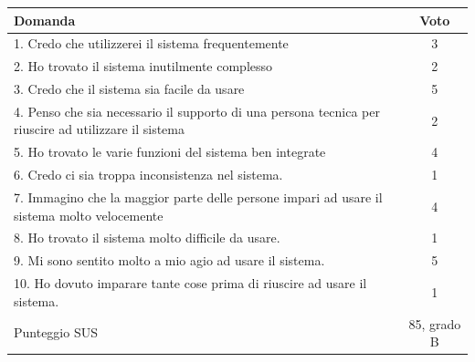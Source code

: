 \documentclass[../Report.tex]{subfiles}
\begin{document}
    \begin{table}[H]
        \begin{tabular}{|p{10cm}|c|}
            \hline
            \textbf{Domanda} & \textbf{Voto}\\
            \hline
            1. \cellcolor{green} Credo che utilizzerei il sistema frequentemente & 3\\
            \hline
            2. \cellcolor{red} Ho trovato il sistema inutilmente complesso & 2 \\
            \hline
            3. \cellcolor{green} Credo che il sistema sia facile da usare & 5 \\
            \hline
            4. \cellcolor{red} Penso che sia necessario il supporto di una persona tecnica per riuscire ad utilizzare il sistema & 2 \\
            \hline
            5. \cellcolor{green} Ho trovato le varie funzioni del sistema ben integrate & 4 \\
            \hline
            6. \cellcolor{red} Credo ci sia troppa inconsistenza nel sistema. & 1\\
            \hline
            7. \cellcolor{green} Immagino che la maggior parte delle persone impari ad usare il sistema molto velocemente & 4 \\
            \hline
            8. \cellcolor{red} Ho trovato il sistema molto difficile da usare. & 1 \\
            \hline
            9. \cellcolor{green} Mi sono sentito molto a mio agio ad usare il sistema. & 5\\
            \hline
            10. \cellcolor{red} Ho dovuto imparare tante cose prima di riuscire ad usare il sistema. & 1 \\ 
            \hline
            Punteggio SUS & 85, grado B \\
            \hline
        \end{tabular}
    \end{table}
\end{document}
